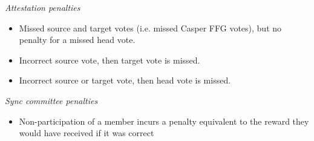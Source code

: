 \documentclass[UTF8]{article}
\begin{document}
\textit{Attestation penalties}
\begin{itemize}
\item Missed source and target votes (i.e. missed Casper FFG votes), but no penalty for a missed head vote.
\item Incorrect source vote, then target vote is missed.
\item Incorrect source or target vote, then head vote is missed.
\end{itemize}

\textit{Sync committee penalties}
\begin{itemize}
\item Non-participation of a member incurs a penalty equivalent to the reward they would have received if it was correct
\end{itemize}
\end{document}
